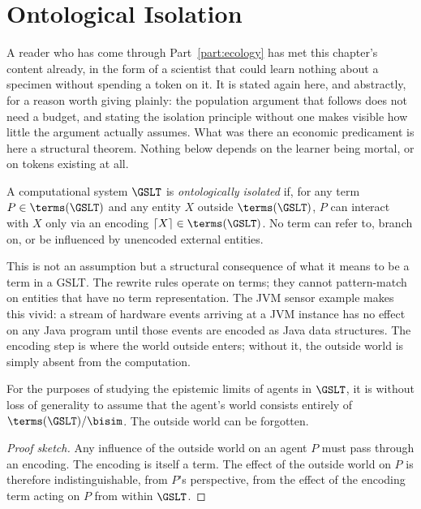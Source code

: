 \chapter{Ontological Isolation}
\label{sec:isolation}

A reader who has come through Part~\ref{part:ecology} has met this
chapter's content already, in the form of a scientist that could learn
nothing about a specimen without spending a token on it.
It is stated again here, and abstractly, for a reason worth giving
plainly: the population argument that follows does not need a budget, and
stating the isolation principle without one makes visible how little the
argument actually assumes.
What was there an economic predicament is here a structural theorem.
Nothing below depends on the learner being mortal, or on tokens existing
at all.

\bigskip

\begin{definition}
A computational system $\GSLT$ is \emph{ontologically isolated} if,
for any term $P \in \terms(\GSLT)$ and any entity $X$ outside
$\terms(\GSLT)$, $P$ can interact with $X$ only via an encoding
$\lceil X \rceil \in \terms(\GSLT)$.
No term can refer to, branch on, or be influenced by unencoded
external entities.
\end{definition}

\begin{remark}
This is not an assumption but a structural consequence of what it
means to be a term in a GSLT.
The rewrite rules operate on terms; they cannot pattern-match on
entities that have no term representation.
The JVM sensor example makes this vivid: a stream of hardware
events arriving at a JVM instance has no effect on any Java program
until those events are encoded as Java data structures.
The encoding step is where the world outside enters; without it,
the outside world is simply absent from the computation.
\end{remark}

\begin{proposition}
For the purposes of studying the epistemic limits of agents in $\GSLT$,
it is without loss of generality to assume that the agent's world
consists entirely of $\terms(\GSLT)/{\bisim}$.
The outside world can be forgotten.
\end{proposition}

\begin{proof}[Proof sketch]
Any influence of the outside world on an agent $P$ must pass through
an encoding.
The encoding is itself a term.
The effect of the outside world on $P$ is therefore indistinguishable,
from $P$'s perspective, from the effect of the encoding term acting
on $P$ from within $\GSLT$.
\end{proof}

